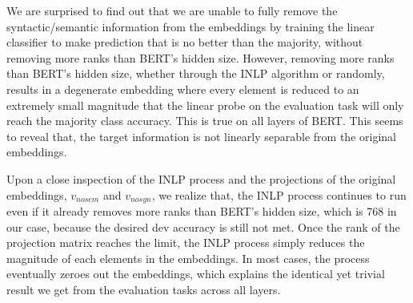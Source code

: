 \documentclass[11pt,a4paper]{article}
\begin{document}
%
We are surprised to find out that we are unable to fully remove the syntactic/semantic information from the embeddings by training the linear classifier to make prediction that is no better than the majority, without removing more ranks than BERT's hidden size. However, removing more ranks than BERT’s hidden size, whether through the INLP algorithm or randomly, results in a degenerate embedding where every element is reduced to an extremely small magnitude that the linear probe on the evaluation task will only reach the majority class accuracy. This is true on all layers of BERT. This seems to reveal that, the target information is not linearly separable from the original embeddings.

Upon a close inspection of the INLP process and the projections of the original embeddings, $v_{nosem}$ and $v_{nosyn}$, we realize that, the INLP process continues to run even if it already removes more ranks than BERT’s hidden size, which is 768 in our case, because the desired dev accuracy is still not met. Once the rank of the projection matrix reaches the limit, the INLP process simply reduces the magnitude of each elements in the embeddings. In most cases, the process eventually zeroes out the embeddings, which explains the identical yet trivial result we get from the evaluation tasks across all layers.




\end{document}
